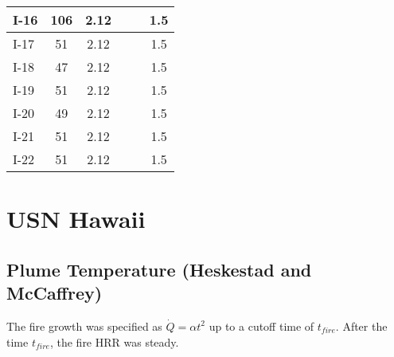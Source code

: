 \begin{table}[!ht]
\begin{center}
\begin{tabular}{|l|c|c||l|c|c|}
I-16       &  106              &  2.12      &            &                   &  1.5       \\ \hline
I-17       &  51               &  2.12      &            &                   &  1.5       \\ \hline
I-18       &  47               &  2.12      &            &                   &  1.5       \\ \hline
I-19       &  51               &  2.12      &            &                   &  1.5       \\ \hline
I-20       &  49               &  2.12      &            &                   &  1.5       \\ \hline
I-21       &  51               &  2.12      &            &                   &  1.5       \\ \hline
I-22       &  51               &  2.12      &            &                   &  1.5       \\ \hline
\end{tabular}
\end{center}
\end{table}


\clearpage


\section{USN Hawaii}

\subsection*{Plume Temperature (Heskestad and McCaffrey)}

The fire growth was specified as $\dot Q = \alpha t^2$ up to a cutoff time of $t_{fire}$.
After the time $t_{fire}$, the fire HRR was steady.

